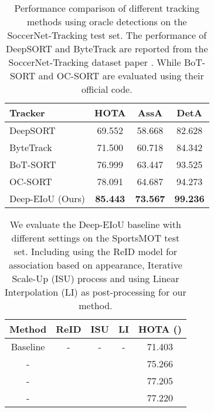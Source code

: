 \documentclass[10pt,twocolumn,letterpaper]{article}
\begin{document}
\begin{table}[h]
\centering
\begin{tabular}{lccc}
\hline
Tracker & HOTA & AssA & DetA \\ \hline
DeepSORT \cite{DeepSORT}          & 69.552 & 58.668 & 82.628  \\
ByteTrack \cite{ByteTrack}        & 71.500 & 60.718 & 84.342  \\
BoT-SORT \cite{aharon2022bot}     & 76.999 & 63.447 & 93.525  \\
OC-SORT  \cite{OCSORT}             & 78.091 & 64.687 & 94.273  \\
\rowcolor{aliceblue}
Deep-EIoU (Ours)  & \textbf{85.443} & \textbf{73.567} & \textbf{99.236} \\
\hline
\end{tabular}
\caption{Performance comparison of different tracking methods using oracle detections on the SoccerNet-Tracking \cite{cioppa2022soccernet} test set. The performance of DeepSORT and ByteTrack are reported from the SoccerNet-Tracking dataset paper \cite{cioppa2022soccernet}. While BoT-SORT and OC-SORT are evaluated using their official code.}
\label{table:soccernet}
\end{table}

\begin{table}[h]
\centering
\begin{tabular}{ccccc}
\hline
Method   & ReID         & ISU          & LI           & HOTA () \\ \hline
Baseline & -            & -            & -            & 71.403\\
-        &  &              &              & 75.266\\
-        &  &  &              & 77.205\\
-        &  &  &  & 77.220\\
\hline
\end{tabular}
\caption{We evaluate the Deep-EIoU baseline with different settings on the SportsMOT test set. Including using the ReID model for association based on appearance, Iterative Scale-Up (ISU) process and using Linear Interpolation (LI) as post-processing for our method.}
\label{table:add}
\end{table}
\end{document}
